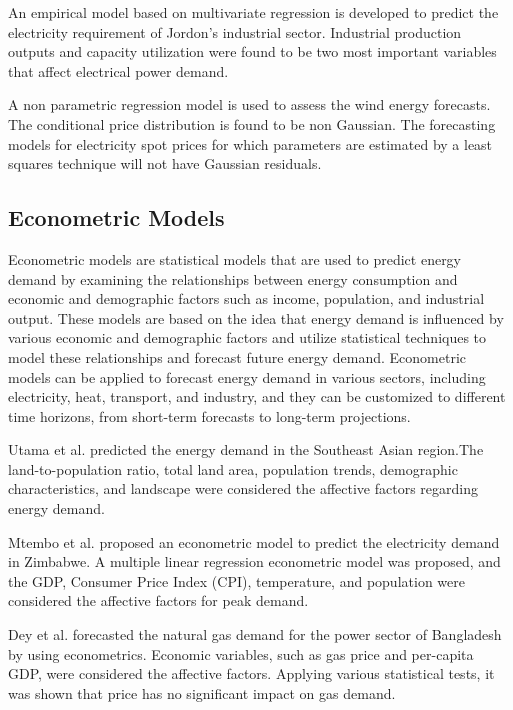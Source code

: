 \documentclass[lettersize,journal]{IEEEtran}
\begin{document}
  An empirical model based on multivariate regression is developed \cite{Al-Ghandoor A} to predict the electricity requirement of Jordon's industrial sector. Industrial production outputs and capacity utilization were found to be two most important variables that affect electrical power demand. 

  
  A non parametric regression model \cite{Jonsson} is used to assess the wind energy forecasts. The conditional price distribution is found to be non Gaussian. The forecasting models for electricity spot prices for which parameters are estimated by a least squares technique will not have Gaussian residuals.





  \subsection{Econometric Models}
  Econometric models are statistical models that are used to predict energy demand by examining the relationships between energy consumption and economic and demographic factors such as income, population, and industrial output. These models are based on the idea that energy demand is influenced by various economic and demographic factors and utilize statistical techniques to model these relationships and forecast future energy demand. Econometric models can be applied to forecast energy demand in various sectors, including electricity, heat, transport, and industry, and they can be customized to different time horizons, from short-term forecasts to long-term projections.


  Utama et al. \cite{Utama}predicted the energy demand in the Southeast Asian region.The land-to-population ratio, total land area, population trends, demographic characteristics, and landscape were considered the affective factors regarding energy demand. 
  
  Mtembo et al. \cite{Mtembo} proposed an econometric model to predict the electricity demand in Zimbabwe. A multiple linear regression econometric model was proposed, and the GDP, Consumer Price Index (CPI), temperature, and population were considered the affective factors for peak demand. 


  Dey et al.  \cite{Dey} forecasted the natural gas demand for the power sector of Bangladesh by using econometrics. Economic variables, such as gas price and per-capita GDP, were considered the affective factors. Applying various statistical tests, it was shown that price has no significant impact on gas demand.
\end{document}
